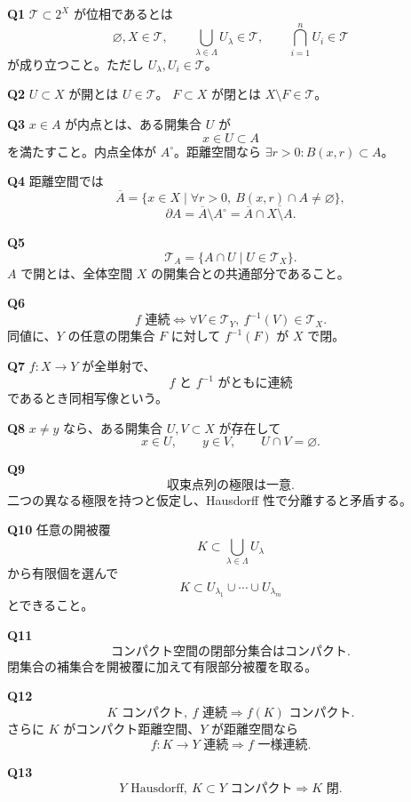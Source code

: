 \documentclass[uplatex,dvipdfmx,9pt]{jsarticle}
\newcommand{\answer}[2]{%
  \par\noindent
  {\color{teal}\bfseries Q#1}\quad #2\par
  \vspace{1.5mm}
}
\newcommand{\must}[1]{\boxed{\displaystyle #1}}
\begin{document}
\begin{multicols}{2}
\answer{1}{
\(\mathcal T\subset2^X\) が位相であるとは
\[
\varnothing,X\in\mathcal T,\qquad
\bigcup_{\lambda\in\Lambda}U_\lambda\in\mathcal T,\qquad
\bigcap_{i=1}^nU_i\in\mathcal T
\]
が成り立つこと。ただし \(U_\lambda,U_i\in\mathcal T\)。}

\answer{2}{
\(U\subset X\) が開とは \(U\in\mathcal T\)。
\(F\subset X\) が閉とは \(X\setminus F\in\mathcal T\)。}

\answer{3}{
\(x\in A\) が内点とは、ある開集合 \(U\) が
\[
x\in U\subset A
\]
を満たすこと。内点全体が \(A^\circ\)。距離空間なら
\(\exists r>0:B(x,r)\subset A\)。}

\answer{4}{
距離空間では
\[
\overline A=\{x\in X\mid
\forall r>0,\ B(x,r)\cap A\ne\varnothing\},
\]
\[
\partial A=\overline A\setminus A^\circ
=\overline A\cap\overline{X\setminus A}.
\]}

\answer{5}{
\[
\must{\mathcal T_A=\{A\cap U\mid U\in\mathcal T_X\}}.
\]
\(A\) で開とは、全体空間 \(X\) の開集合との共通部分であること。}

\answer{6}{
\[
\must{
f\text{ 連続}
\iff
\forall V\in\mathcal T_Y,\ f^{-1}(V)\in\mathcal T_X}.
\]
同値に、\(Y\) の任意の閉集合 \(F\) に対して
\(f^{-1}(F)\) が \(X\) で閉。}

\answer{7}{
\(f:X\to Y\) が全単射で、
\[
\must{f\text{ と }f^{-1}\text{ がともに連続}}
\]
であるとき同相写像という。}

\answer{8}{
\(x\ne y\) なら、ある開集合 \(U,V\subset X\) が存在して
\[
x\in U,\qquad y\in V,\qquad U\cap V=\varnothing.
\]}

\answer{9}{
\[
\must{\text{収束点列の極限は一意}}.
\]
二つの異なる極限を持つと仮定し、Hausdorff 性で分離すると矛盾する。}

\answer{10}{
任意の開被覆
\[
K\subset\bigcup_{\lambda\in\Lambda}U_\lambda
\]
から有限個を選んで
\[
\must{K\subset U_{\lambda_1}\cup\cdots\cup U_{\lambda_m}}
\]
とできること。}

\columnbreak

\answer{11}{
\[
\must{\text{コンパクト空間の閉部分集合はコンパクト}}.
\]
閉集合の補集合を開被覆に加えて有限部分被覆を取る。}

\answer{12}{
\[
\must{K\text{ コンパクト},\ f\text{ 連続}
\Longrightarrow f(K)\text{ コンパクト}}.
\]
さらに \(K\) がコンパクト距離空間、\(Y\) が距離空間なら
\[
\must{f:K\to Y\text{ 連続}\Longrightarrow f\text{ 一様連続}}.
\]}

\answer{13}{
\[
\must{Y\text{ Hausdorff},\ K\subset Y\text{ コンパクト}
\Longrightarrow K\text{ 閉}}.
\]}


\end{multicols}
\end{document}
